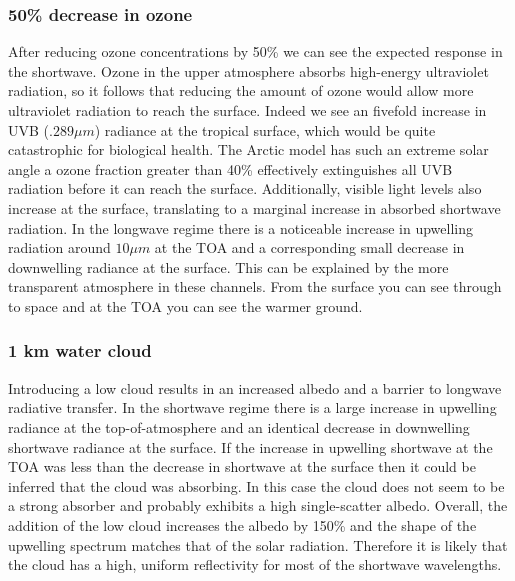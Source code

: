 \documentclass[twocol]{ametsoc}
\begin{document}
\subsubsection{50\% decrease in ozone}
After reducing ozone concentrations by 50\% we can see the expected response in the shortwave. Ozone in the upper atmosphere absorbs high-energy ultraviolet radiation, so it follows that reducing the amount of ozone would allow more ultraviolet radiation to reach the surface. Indeed we see an fivefold increase in UVB ($.289\mu m$) radiance at the tropical surface, which would be quite catastrophic for biological health. The Arctic model has such an extreme solar angle a ozone fraction greater than 40\% effectively extinguishes all UVB radiation before it can reach the surface. Additionally, visible light levels also increase at the surface, translating to a marginal increase in absorbed shortwave radiation. In the longwave regime there is a noticeable increase in upwelling radiation around $10\mu m$ at the TOA and a corresponding small decrease in downwelling radiance at the surface. This can be explained by the more transparent atmosphere in these channels. From the surface you can see through to space and at the TOA you can see the warmer ground.

\subsubsection{1 km water cloud}
Introducing a low cloud results in an increased albedo and a barrier to longwave radiative transfer. In the shortwave regime there is a large increase in upwelling radiance at the top-of-atmosphere and an identical decrease in downwelling shortwave radiance at the surface. If the increase in upwelling shortwave at the TOA was less than the decrease in shortwave at the surface then it could be inferred that the cloud was absorbing. In this case the cloud does not seem to be a strong absorber and probably exhibits a high single-scatter albedo. Overall, the addition of the low cloud increases the albedo by 150\% and the shape of the upwelling spectrum matches that of the solar radiation. Therefore it is likely that the cloud has a high, uniform reflectivity for most of the shortwave wavelengths.
\end{document}
